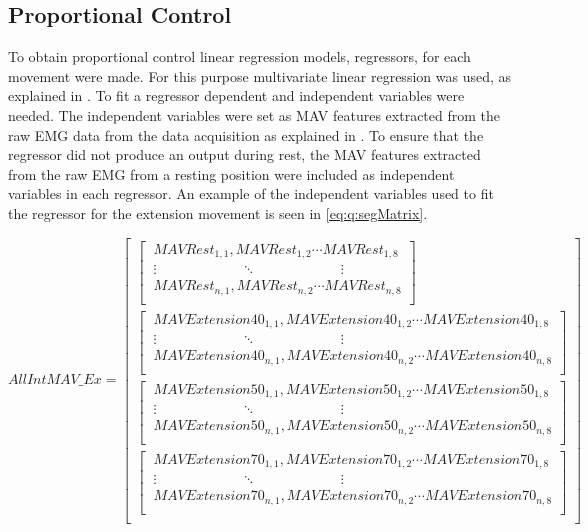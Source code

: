 \subsection{Proportional Control} \label{sub:M:regression}
To obtain proportional control linear regression models, regressors, for each movement were made. For this purpose multivariate linear regression was used, as explained in . To fit a regressor dependent and independent variables were needed. The independent variables were set as MAV features extracted from the raw EMG data from the data acquisition as explained in . To ensure that the regressor did not produce an output during rest, the MAV features extracted from the raw EMG from a resting position were included as independent variables in each regressor. An example of the independent variables used to fit the regressor for the extension movement is seen in \eqref{eq:q:segMatrix}.

\begin{equation} \label{eq:segMatrix}
AllIntMAV\_Ex=\begin{bmatrix}
\begin{bmatrix}
\ MAVRest_{1,1}, MAVRest_{1,2} \cdots MAVRest_{1,8} \\ 
\ \vdots \qquad \qquad \qquad \ddots \qquad \qquad \qquad \vdots \\
\ MAVRest_{n,1}, MAVRest_{n,2}  \cdots MAVRest_{n,8} \\ \end{bmatrix} \\
\begin{bmatrix}
\ MAVExtension40_{1,1}, MAVExtension40_{1,2} \cdots MAVExtension40_{1,8} \\ 
\ \vdots \qquad \qquad \qquad \ddots \qquad \qquad \qquad \vdots \\
\ MAVExtension40_{n,1}, MAVExtension40_{n,2}  \cdots MAVExtension40_{n,8} \\ \end{bmatrix} \\
\begin{bmatrix} 
\ MAVExtension50_{1,1}, MAVExtension50_{1,2} \cdots MAVExtension50_{1,8} \\
\ \vdots \qquad \qquad \qquad \ddots \qquad \qquad \qquad \vdots \\
\ MAVExtension50_{n,1}, MAVExtension50_{n,2} \cdots MAVExtension50_{n,8} \\ \end{bmatrix} \\
\begin{bmatrix} 
\ MAVExtension70_{1,1}, MAVExtension70_{1,2} \cdots MAVExtension70_{1,8} \\
\ \vdots \qquad \qquad \qquad \ddots \qquad \qquad \qquad \vdots \\
\ MAVExtension70_{n,1}, MAVExtension70_{n,2} \cdots MAVExtension70_{n,8} \\ \end{bmatrix} \\
\end{bmatrix}
\end{equation}

